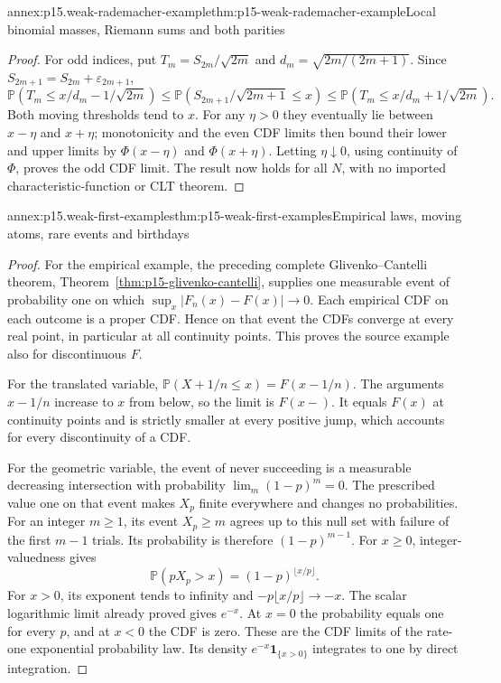 \begin{annexitem}{annex:p15.weak-rademacher-example}{thm:p15-weak-rademacher-example}{Local binomial masses, Riemann sums and both parities}
\begin{proof}
For odd indices, put \(T_m=S_{2m}/\sqrt{2m}\) and
\(d_m=\sqrt{2m/(2m+1)}\).
Since \(S_{2m+1}=S_{2m}+\varepsilon_{2m+1}\),
\[
 \mathbb P\!\left(T_m\leq x/d_m-1/\sqrt{2m}\right)
 \leq\mathbb P(S_{2m+1}/\sqrt{2m+1}\leq x)
 \leq\mathbb P\!\left(T_m\leq x/d_m+1/\sqrt{2m}\right).
\]
Both moving thresholds tend to \(x\).
For any \(\eta>0\) they eventually lie between \(x-\eta\)
and \(x+\eta\); monotonicity and the even CDF limits then
bound their lower and upper limits by \(\Phi(x-\eta)\)
and \(\Phi(x+\eta)\).
Letting \(\eta\downarrow0\), using continuity of \(\Phi\),
proves the odd CDF limit. The result now holds for all \(N\),
with no imported characteristic-function or CLT theorem.
\end{proof}
\end{annexitem}

\begin{annexitem}{annex:p15.weak-first-examples}{thm:p15-weak-first-examples}{Empirical laws, moving atoms, rare events and birthdays}
\begin{proof}
For the empirical example, the preceding complete
Glivenko--Cantelli theorem,
Theorem~\ref{thm:p15-glivenko-cantelli}, supplies one
measurable event of probability one on which
\(\sup_x|F_n(x)-F(x)|\to0\).
Each empirical CDF on each outcome is a proper CDF.
Hence on that event the CDFs converge at every real point,
in particular at all continuity points. This proves the
source example also for discontinuous \(F\).

For the translated variable,
\(\mathbb P(X+1/n\leq x)=F(x-1/n)\).
The arguments \(x-1/n\) increase to \(x\) from below, so
the limit is \(F(x-)\). It equals \(F(x)\) at continuity
points and is strictly smaller at every positive jump,
which accounts for every discontinuity of a CDF.

For the geometric variable, the event of never succeeding is
a measurable decreasing intersection with probability
\(\lim_m(1-p)^m=0\). The prescribed value one on that event
makes \(X_p\) finite everywhere and changes no probabilities.
For an integer \(m\geq1\), its event \(X_p\geq m\) agrees
up to this null set with failure of the first \(m-1\) trials.
Its probability is therefore \((1-p)^{m-1}\).
For \(x\geq0\), integer-valuedness gives
\[
 \mathbb P(pX_p>x)=(1-p)^{\lfloor x/p\rfloor}.
\]
For \(x>0\), its exponent tends to infinity and
\(-p\lfloor x/p\rfloor\to-x\).
The scalar logarithmic limit already proved gives \(e^{-x}\).
At \(x=0\) the probability equals one for every \(p\),
and at \(x<0\) the CDF is zero. These are the CDF limits
of the rate-one exponential probability law. Its density
\(e^{-x}\mathbf1_{\{x>0\}}\) integrates to one by direct
integration.


\end{proof}
\end{annexitem}
